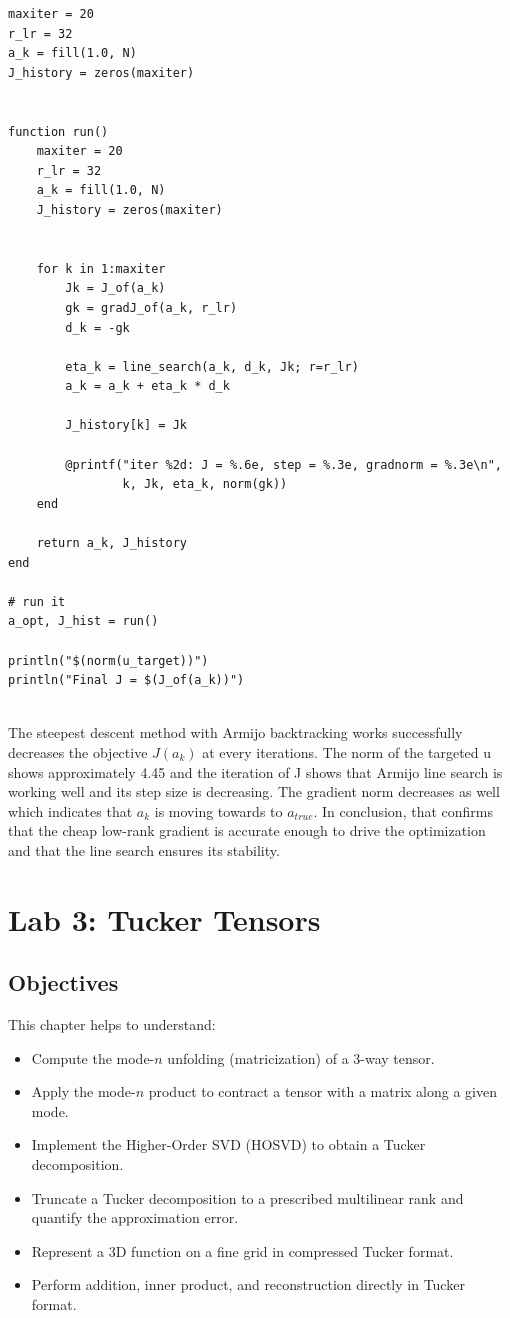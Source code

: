 \documentclass[11pt]{report}
\begin{document}
\begin{lstlisting}
maxiter = 20
r_lr = 32
a_k = fill(1.0, N)   
J_history = zeros(maxiter)


function run()
    maxiter = 20
    r_lr = 32
    a_k = fill(1.0, N)
    J_history = zeros(maxiter)


    for k in 1:maxiter
        Jk = J_of(a_k)
        gk = gradJ_of(a_k, r_lr)
        d_k = -gk

        eta_k = line_search(a_k, d_k, Jk; r=r_lr)
        a_k = a_k + eta_k * d_k

        J_history[k] = Jk

        @printf("iter %2d: J = %.6e, step = %.3e, gradnorm = %.3e\n",
                k, Jk, eta_k, norm(gk))
    end

    return a_k, J_history
end

# run it
a_opt, J_hist = run()

println("$(norm(u_target))")
println("Final J = $(J_of(a_k))")


\end{lstlisting}

The steepest descent method with Armijo backtracking works successfully decreases the objective $J(a_k)$ at every iterations. The norm of the targeted u shows approximately 4.45 and the iteration of J shows that Armijo line search is working well and its step size is decreasing. The gradient norm decreases as well which indicates that $a_k$ is moving towards to $a_{true}$. In conclusion, that confirms that the cheap low-rank gradient is accurate enough to drive the optimization and that the line search ensures its stability.

\chapter{Lab 3: Tucker Tensors}

\section{Objectives}

This chapter helps to understand:
\begin{itemize}[leftmargin=*]
    \item Compute the mode-\(n\) unfolding (matricization) of a 3-way tensor.
    \item Apply the mode-\(n\) product to contract a tensor with a matrix along a given mode.
    \item Implement the Higher-Order SVD (HOSVD) to obtain a Tucker decomposition.
    \item Truncate a Tucker decomposition to a prescribed multilinear rank and quantify the approximation error.
    \item Represent a 3D function on a fine grid in compressed Tucker format.
    \item Perform addition, inner product, and reconstruction directly in Tucker format.
\end{itemize}
\end{document}
